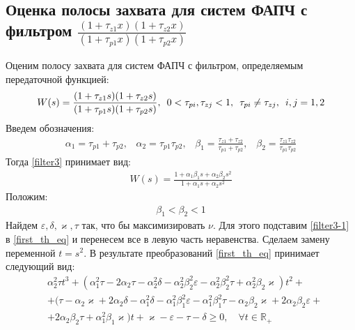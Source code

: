 \documentclass[a4paper,article,14pt]{extarticle}
\begin{document}
\subsection{Оценка полосы захвата для систем ФАПЧ с фильтром $\frac{(1+\tau_{z1}x)(1+\tau_{z2}x)}{(1+\tau_{p1}x)(1+\tau_{p2}x)}$}
Оценим полосу захвата для систем ФАПЧ с фильтром, определяемым передаточной функцией:
 \begin{equation}\label{filter3}
 \begin{aligned}
W(s) = \frac{(1+\tau_{z1}s)(1+\tau_{z2}s)}{(1+\tau_{p1}s)(1+\tau_{p2}s)}, \enskip 0<\tau_{pi},\tau_{zj} < 1, \enskip \tau_{pi} \neq \tau_{zj}, \enskip i,j=1,2
 \end{aligned}
\end{equation}
Введем обозначения:
 \begin{equation}
 \begin{aligned}
\alpha_1 = \tau_{p1} + \tau_{p2}\text{,}\quad 
\alpha_2 = \tau_{p1}\tau_{p2}\text{,}\quad 
\beta_1 = \frac{\tau_{z1}+\tau_{z2}}{\tau_{p1}+\tau_{p2}}\text{,}\quad 
\beta_2 = \frac{\tau_{z1}\tau_{z2}}{\tau_{p1}\tau_{p2}}
 \end{aligned}
\end{equation}
Тогда \eqref{filter3} принимает вид:
 \begin{equation}\label{filter3-1}
 \begin{aligned}
W(s) = \frac{1+\alpha_1\beta_1s + \alpha_2\beta_2s^2}{1+\alpha_1s + \alpha_2s^2}
 \end{aligned}
\end{equation}
Положим:
 \begin{equation}\label{restriction-1}
 \begin{aligned}
\beta_1 < \beta_2 < 1
 \end{aligned}
\end{equation}
Найдем $\varepsilon, \delta, \varkappa, \tau$ так, что бы максимизировать $\nu$. Для этого подставим \eqref{filter3-1} в \eqref{first_th_eq} и перенесем все в левую часть неравенства. Сделаем замену переменной $t = s^2$. В результате преобразований \eqref{first_th_eq} принимает следующий вид:
 \begin{equation}\label{filter3-th_first-1}
 \begin{aligned}
&\alpha_2^2\tau t^3 + (\alpha_1^2\tau - 2\alpha_2\tau - \alpha_2^2\delta - \alpha_2^2\beta_2^2\varepsilon - \alpha_2^2\beta_2^2\tau + \alpha_2^2\beta_2\varkappa)t^2 +\\
&+ (\tau - \alpha_2\varkappa + 2\alpha_2\delta - \alpha_1^2\delta - \alpha_1^2\beta_1^2\varepsilon - \alpha_1^2\beta_1^2\tau - \alpha_2\beta_2\varkappa + 2\alpha_2\beta_2\varepsilon + \\
&+2\alpha_2\beta_2\tau + \alpha_1^2\beta_1\varkappa)t + \varkappa - \varepsilon - \tau - \delta \geqslant 0, \quad \forall t \in \mathbb{R_+}
 \end{aligned}
\end{equation}
\end{document}
